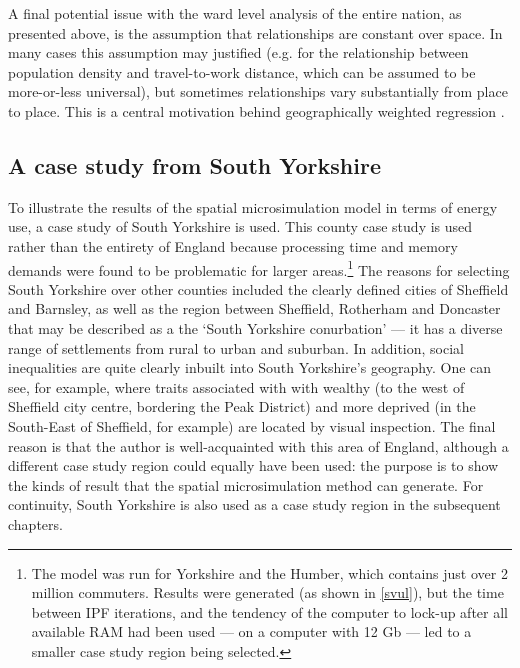 A final potential issue with the ward level analysis of the entire nation, as presented
above, is the assumption that relationships are constant over space.
In many cases this assumption may justified (e.g. for the relationship between
population density and travel-to-work distance, which can be assumed to be
more-or-less universal), but sometimes relationships vary
substantially from place to place. This is a central motivation behind
geographically weighted regression \citep{Fotheringham2002}.

\subsection{A case study from South Yorkshire} \label{soyoref}
To illustrate the results of the spatial microsimulation model
in terms of energy use, a case study of South Yorkshire is used.
This county case study is used rather than the entirety of England because
processing time and memory demands were found to be problematic for
larger areas.\footnote{The
model was run for
Yorkshire and the Humber, which contains just over 2 million commuters.
Results were generated (as shown in \cref{svul}), but the time between
IPF iterations, and the tendency of the computer to lock-up after all
available RAM had been used --- on a computer with 12 Gb ---
led to a smaller case study region being selected.
}
The reasons for selecting South Yorkshire over other counties included the
clearly defined cities of Sheffield and Barnsley, as well as the region
between Sheffield, Rotherham and Doncaster that may be described as a
the `South Yorkshire conurbation' \citep{barker1978perthes} --- it has
a diverse range of settlements from rural to urban and suburban.
In addition, social inequalities are quite clearly inbuilt into South Yorkshire's
geography. One can see, for example, where traits associated with
with wealthy (to the west of Sheffield city centre, bordering
the Peak District) and more deprived (in the South-East of Sheffield,
for example) are located by visual inspection. The final reason
is that the author is well-acquainted with this area of England,
although a different case study region could equally have been used:
the purpose is to show the kinds of result that the
spatial microsimulation method can generate.
For continuity, 
South Yorkshire is also used as a case study region in the subsequent chapters.

